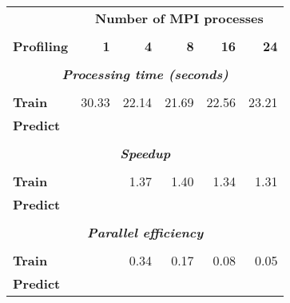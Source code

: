 \begin{tabular}{lrrrrr}\toprule											
	&	\multicolumn{5}{c}{\textbf{Number of MPI processes}}									\\
\cline{2-6}\vspace{-8pt}	&		&		&		&		&		\\
\textbf{Profiling}	&	\textbf{1}	&	\textbf{4}	&	\textbf{8}	&	\textbf{16}	&	\textbf{24}	\vspace{1pt}\\
\toprule\vspace{-10pt}	&		&		&		&		&		\\
\multicolumn{6}{c}{\textbf{\textit{Processing time (seconds)}}}											\\
\midrule[0.1pt]\vspace{-10pt}	&		&		&		&		&		\\
\textbf{Train}	&	30.33	&	22.14	&	21.69	&	22.56	&	23.21	\\
\textbf{Predict}	&	\color{red}{0.10}	&	\color{red}{0.05}	&	\color{red}{0.03}	&	\color{red}{0.03}	&	\color{red}{0.03}	\\
\toprule\vspace{-10pt}	&		&		&		&		&		\\
\multicolumn{6}{c}{\textbf{\textit{Speedup}}}											\\
\midrule[0.1pt]\vspace{-10pt}	&		&		&		&		&		\\
\textbf{Train}	&	\color{red}{1.00}	&	1.37	&	1.40	&	1.34	&	1.31	\\
\textbf{Predict}	&	\color{red}{1.00}	&	\color{red}{2.15}	&	\color{red}{3.14}	&	\color{red}{3.53}	&	\color{red}{3.65}	\\
\toprule\vspace{-10pt}	&		&		&		&		&		\\
\multicolumn{6}{c}{\textbf{\textit{Parallel efficiency}}}											\\
\midrule[0.1pt]\vspace{-10pt}	&		&		&		&		&		\\
\textbf{Train}	&	\color{red}{1.00}	&	0.34	&	0.17	&	0.08	&	0.05	\\
\textbf{Predict}	&	\color{red}{1.00}	&	\color{red}{0.54}	&	\color{red}{0.39}	&	\color{red}{0.22}	&	\color{red}{0.15}	\\
\bottomrule											
\end{tabular}																				